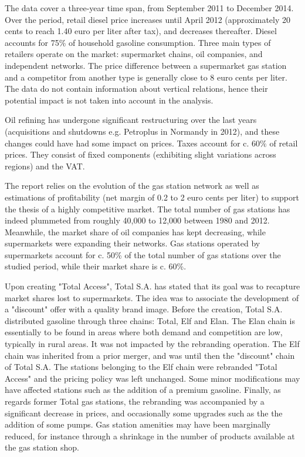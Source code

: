 \documentclass[english]{article}
\begin{document}
The data cover a three-year time span, from September 2011 to December 2014. Over the period, retail diesel price increases until April 2012 (approximately 20 cents to reach 1.40 euro per liter after tax), and decreases thereafter. Diesel accounts for 75\% of household gasoline consumption. Three main types of retailers operate on the market: supermarket chains, oil companies, and independent networks. The price difference between a supermarket gas station and a competitor from another type is generally close to 8 euro cents per liter. The data do not contain information about vertical relations, hence their potential impact is not taken into account in the analysis.

Oil refining has undergone significant restructuring over the last years (acquisitions and shutdowns e.g. Petroplus in Normandy in 2012), and these changes could have had some impact on prices. Taxes account for c. 60$\%$ of retail prices. They consist of fixed components (exhibiting slight variations across regions) and the VAT.
\medskip{}

The \cite{BEL12} report relies on the evolution of the gas station network as well as estimations of profitability (net margin of 0.2 to 2 euro cents per liter) to support the thesis of a highly competitive market. The total number of gas stations has indeed plummeted from roughly 40,000 to 12,000 between 1980 and 2012. Meanwhile, the market share of oil companies has kept decreasing, while supermarkets were expanding their networks. Gas stations operated by supermarkets account for c. 50\% of the total number of gas stations over the studied period, while their market share is c. 60\%.
\medskip{}

Upon creating "Total Access", Total S.A. has stated that its goal was to recapture market shares lost to supermarkets. The idea was to associate the development of a "discount" offer with a quality brand image. Before the creation, Total S.A. distributed gasoline through three chains: Total, Elf and Elan. The Elan chain is essentially to be found in areas where both demand and competition are low, typically in rural areas. It was not impacted by the rebranding operation. The Elf chain was inherited from a prior merger, and was until then the "discount" chain of Total S.A. The stations belonging to the Elf chain were rebranded "Total Access" and the pricing policy was left unchanged. Some minor modifications may have affected stations such as the addition of a premium gasoline. Finally, as regards former Total gas stations, the rebranding was accompanied by a significant decrease in prices, and occasionally some upgrades such as the the addition of some pumps. Gas station amenities may have been marginally reduced, for instance through a shrinkage in the number of products available at the gas station shop.
\medskip{}
\end{document}
